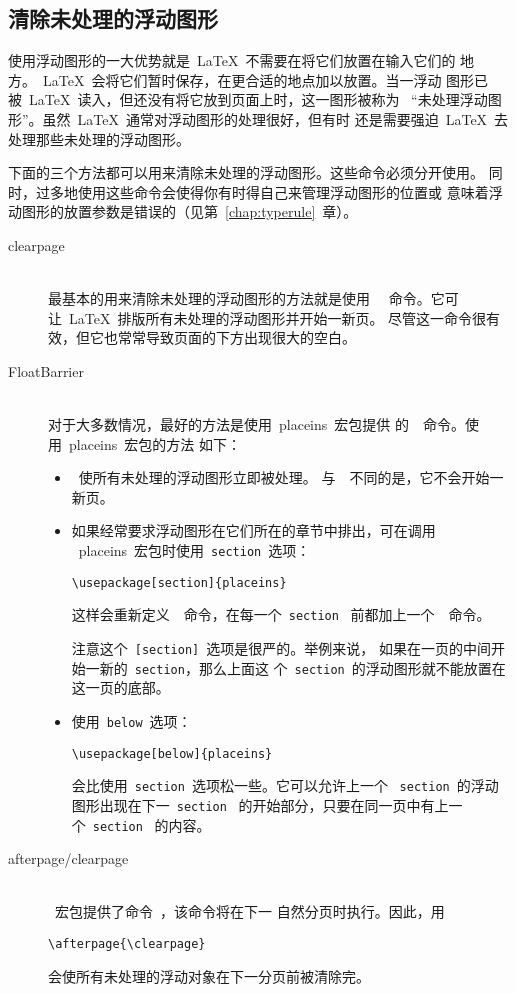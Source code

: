\subsection{清除未处理的浮动图形}\label{ssec:unprocessfig}

使用浮动图形的一大优势就是~\LaTeX{}~不需要在将它们放置在输入它们的
地方。~\LaTeX{}~会将它们暂时保存，在更合适的地点加以放置。当一浮动
图形已被~\LaTeX{}~读入，但还没有将它放到页面上时，这一图形被称为
~``未处理浮动图形''。虽然~\LaTeX{}~通常对浮动图形的处理很好，但有时
还是需要强迫~\LaTeX{}~去处理那些未处理的浮动图形。

下面的三个方法都可以用来清除未处理的浮动图形。这些命令必须分开使用。
同时，过多地使用这些命令会使得你有时得自己来管理浮动图形的位置或
意味着浮动图形的放置参数是错误的（见第~\ref{chap:typerule}~章）。

\begin{description}
	\item [clearpage] \mbox{} \\
	最基本的用来清除未处理的浮动图形的方法就是使用~~
	命令。它可让~\LaTeX{}~排版所有未处理的浮动图形并开始一新页。
	尽管这一命令很有效，但它也常常导致页面的下方出现很大的空白。
	\item [FloatBarrier] \mbox{} \\
	对于大多数情况，最好的方法是使用~\textsf{placeins}~宏包提供
	的~~命令。使用~\textsf{placeins}~宏包的方法
	如下：
	\begin{itemize}
		\item {}~使所有未处理的浮动图形立即被处理。
		与~~不同的是，它不会开始一新页。
		\item 如果经常要求浮动图形在它们所在的章节中排出，可在调用
		~\textsf{placeins}~宏包时使用~\texttt{section}~选项：
		\begin{Verbatim}[xleftmargin=1cm]
		\usepackage[section]{placeins}
		\end{Verbatim}
		这样会重新定义~~命令，在每一个~\texttt{section}~
		前都加上一个~~命令。
		
		注意这个~\texttt{[section]}~选项是很严的。举例来说，
		如果在一页的中间开始一新的~\texttt{section}，那么上面这
		个~\texttt{section}~的浮动图形就不能放置在这一页的底部。
		\item 使用~\texttt{below}~选项：
		\begin{Verbatim}[xleftmargin=1cm]
		\usepackage[below]{placeins}
		\end{Verbatim}
		会比使用~\texttt{section}~选项松一些。它可以允许上一个
		~\texttt{section}~的浮动图形出现在下一~\texttt{section}~
		的开始部分，只要在同一页中有上一个~\texttt{section}~
		的内容。
	\end{itemize}
	\item [afterpage/clearpage] \mbox{} \\
	~宏包提供了命令~，该命令将在下一
	自然分页时执行。因此，用
	\begin{Verbatim}[xleftmargin=1cm]
	\afterpage{\clearpage}
	\end{Verbatim}
	会使所有未处理的浮动对象在下一分页前被清除完。
	

\end{description}
